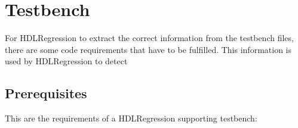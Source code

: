 \documentclass[letterpaper,10pt,english]{sphinxmanual}
\begin{document}
\sphinxstepscope


\chapter{Testbench}
\label{\detokenize{testbench:testbench}}\label{\detokenize{testbench::doc}}
\sphinxAtStartPar
For HDLRegression to extract the correct information from the testbench files, there are some
code requirements that have to be fulfilled. This information is used by HDLRegression to
detect


\section{Prerequisites}
\label{\detokenize{testbench:prerequisites}}
\sphinxAtStartPar
This are the requirements of a HDLRegression supporting testbench:
\end{document}
